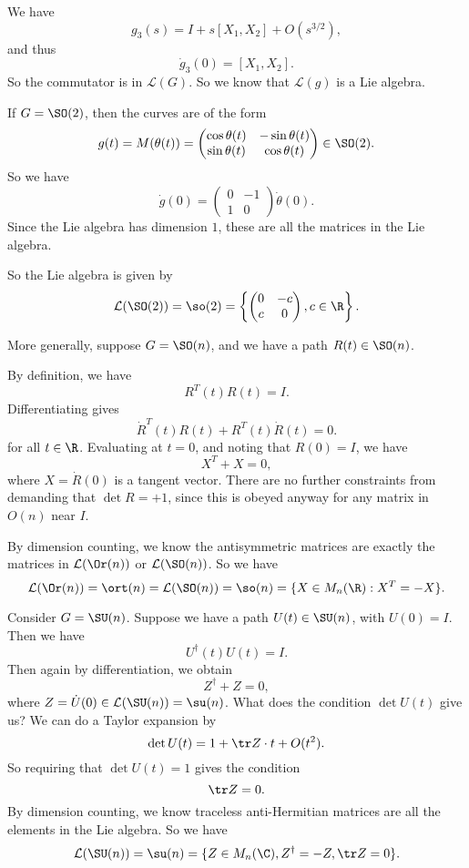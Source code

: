 \documentclass[a4paper]{article}
\begin{document}
We have
\[
  g_3(s) = I + s[X_1, X_2] + O(s^{3/2}),
\]
and thus
\[
  \dot{g}_3(0) = [X_1, X_2].
\]
So the commutator is in $\mathcal{L}(G)$. So we know that $\mathcal{L}(g)$ is a Lie algebra.

\begin{eg}
  If $G = \SO(2)$, then the curves are of the form
  \[
    g(t) = M(\theta(t)) =
    \begin{pmatrix}
      \cos \theta(t) & -\sin \theta (t)\\
      \sin \theta(t) & \cos \theta(t)
    \end{pmatrix} \in \SO(2).
  \]
  So we have
  \[
    \dot{g}(0) =
    \begin{pmatrix}
      0 & -1\\
      1 & 0
    \end{pmatrix} \dot{\theta}(0).
  \]
  Since the Lie algebra has dimension $1$, these are all the matrices in the Lie algebra.

  So the Lie algebra is given by
  \[
    \mathcal{L}(\SO(2)) = \so(2) = \left\{
      \begin{pmatrix}
        0 & -c\\
        c & 0
      \end{pmatrix}, c \in \R
    \right\}.
  \]
\end{eg}

\begin{eg}
  More generally, suppose $G = \SO(n)$, and we have a path $R(t) \in \SO(n)$.

  By definition, we have
  \[
    R^T(t) R(t) = I.
  \]
  Differentiating gives
  \[
    \dot{R}^T(t) R(t) + R^T(t) \dot{R}(t) = 0.
  \]
  for all $t \in \R$. Evaluating at $t = 0$, and noting that $R(0) = I$, we have
  \[
    X^T + X = 0,
  \]
  where $X = \dot{R}(0)$ is a tangent vector. There are no further constraints from demanding that $\det R = +1$, since this is obeyed anyway for any matrix in $O(n)$ near $I$.

  By dimension counting, we know the antisymmetric matrices are exactly the matrices in $\mathcal{L}(\Or(n))$ or $\mathcal{L}(\SO(n))$. So we have
  \[
    \mathcal{L}(\Or(n)) = \ort(n) = \mathcal{L}(\SO(n)) = \so(n) = \{X \in M_n(\R): X^T = -X\}.
  \]
\end{eg}

\begin{eg}
  Consider $G = \SU(n)$. Suppose we have a path $U(t) \in \SU(n)$, with $U(0) = I$. Then we have
  \[
    U^\dagger (t) U(t) = I.
  \]
  Then again by differentiation, we obtain
  \[
    Z^\dagger + Z = 0,
  \]
  where $Z = \dot{U}(0) \in \mathcal{L}(\SU(n)) = \su(n)$. What does the condition $\det U(t)$ give us? We can do a Taylor expansion by
  \[
    \det U(t) = 1 + \tr Z \cdot t + O(t^2).
  \]
  So requiring that $\det U(t) = 1$ gives the condition
  \[
    \tr Z = 0.
  \]
  By dimension counting, we know traceless anti-Hermitian matrices are all the elements in the Lie algebra. So we have
  \[
    \mathcal{L}(\SU(n)) = \su(n) = \{Z \in M_n(\C), Z^\dagger = -Z, \tr Z = 0\}.
  \]
\end{eg}
\end{document}
